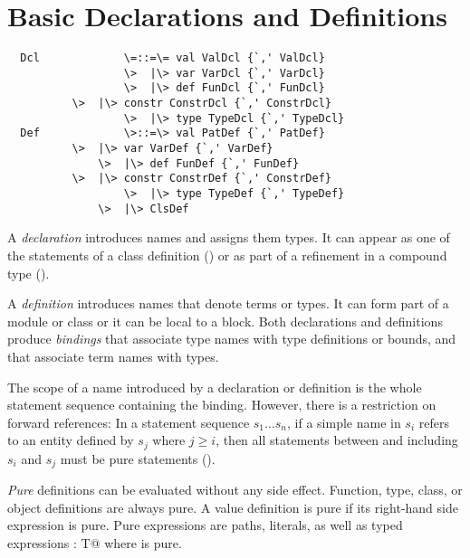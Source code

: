 \documentclass[11pt]{report}
\newcommand{\iflet}[1]{}
\begin{document}
\chapter{Basic Declarations and Definitions}
\label{sec:defs}

\syntax\begin{verbatim}
  Dcl             \=::=\= val ValDcl {`,' ValDcl}
                  \>  |\> var VarDcl {`,' VarDcl}
                  \>  |\> def FunDcl {`,' FunDcl}
		  \>  |\> constr ConstrDcl {`,' ConstrDcl}
                  \>  |\> type TypeDcl {`,' TypeDcl}
  Def             \>::=\> val PatDef {`,' PatDef}
		  \>  |\> var VarDef {`,' VarDef}
  	          \>  |\> def FunDef {`,' FunDef}
		  \>  |\> constr ConstrDef {`,' ConstrDef}
                  \>  |\> type TypeDef {`,' TypeDef}
	          \>  |\> ClsDef
\end{verbatim}
\iflet{$\LET$ ValDef {`,' ValDef}}

A {\em declaration} introduces names and assigns them types. It can
appear as one of the statements of a class definition
() or as part of a refinement in a compound
type ().

A {\em definition} introduces names
that denote terms or types. It can form part of a module or class or
it can be local to a block.  Both declarations and definitions produce
{\em bindings} that associate type names with type definitions or
bounds, and that associate term names with types.

The scope of a name introduced by a declaration or definition is the
whole statement sequence containing the binding.  However, there is a
restriction on forward references: In a statement sequence $s_1 \ldots
s_n$, if a simple name in $s_i$ refers to an entity defined by $s_j$
where $j \geq i$, then all statements between and including $s_i$ and
$s_j$ must be pure statements ().

{\em Pure} definitions can be evaluated without any side effect.
Function, type, class, or object definitions are always pure. A value
definition is pure if its right-hand side expression is pure. Pure
expressions are paths, literals, as well as typed expressions
\verb@e: T@ where \verb@e@ is pure.
\end{document}
